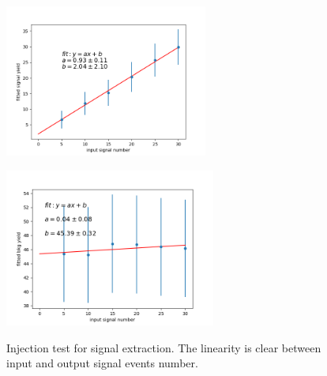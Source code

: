 \begin{figure}[H]
	\begin{minipage}[b]{0.5\linewidth}
		\centering 
		\includegraphics[height=5cm]{figures/inject_line_sig}
		\label{}
	\end{minipage}
	\begin{minipage}[b]{0.5\linewidth}
		\centering 
		\includegraphics[height=5.2cm]{figures/inject_line_bkg}
		\label{}
	\end{minipage}
	\caption{Injection test for signal extraction. The linearity is clear between input and output signal events number.}
	\label{fig:2Dinjectline}
\end{figure}

